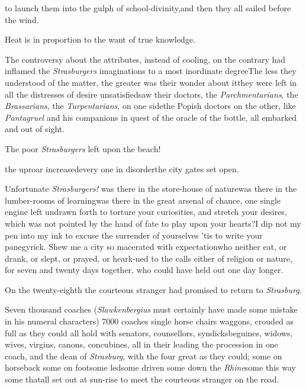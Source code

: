 \documentclass{article}
\begin{document}
to launch them into the gulph of school-divinity,\tsk and then they all
sailed before the wind.

Heat is in proportion to the want of true knowledge.

The controversy about the attributes, \etc instead of
cooling, on the contrary had inflamed the \textit{Strasburgers}
imaginations to a most inordinate degree\tsk The less they
understood of the matter, the greater was their wonder about
it\tsk they were left in all the distresses of desire
unsatisfied\tsk saw their doctors, the
\textit{Parchmentarians}, the \textit{Brassarians}, the
\textit{Turpentarians}, on one side\tsk the Popish
doctors
on the other, like \textit{Pantagruel} and his companions in
quest of the oracle of the bottle, all embarked and out of
sight.

\tsh The poor \textit{Strasburgers} left upon the
beach!

\noindent
{}\break
\tsk the uproar
increased\tsk every one in disorder\tsk the city gates set
open.\tsk

Unfortunate \textit{Strasburgers!} was there in the
store-house of nature\tsk was there in the lumber-rooms of
learning\tsk was there in the great arsenal of chance, one
single engine left undrawn forth to torture your
curiosities, and stretch your desires, which was not pointed
by the hand of fate to play upon your hearts?\tsk I dip not
my pen into my ink to excuse the surrender of yourselves\tsk
’tis to write your panegyrick. Shew me a city so macerated
with expectation\tsh who neither eat, or drank, or slept, or
prayed, or heark-\break ned to the calls either of religion or
nature, for seven and twenty days together, who could have
held out one day longer.

On the twenty-eighth the courteous stranger had promised to
return to \textit{Strasburg.}

Seven thousand coaches (\textit{Slawkenber\-gius} must certainly have made some
mistake in his numeral characters) 7000\break
coaches single horse chairs\tsh{} waggons, crouded as full as they could all hold with senators, counsellors, 
syndicks\tsk beguines, widows, wives, virgins, canons,
concubines, all in their\break
{}
leading the procession in one coach, and the dean of \textit{Strasburg}, with the
four great \break
{}
as they could; some on horseback\tsh 
some on foot\tsk some led\tsk some driven\tsk
some down the \textit{Rhine}\tsk some this way\tsk
some that\tsk all set out at sun-rise to meet 
the courteous stranger on the road.
\end{document}
